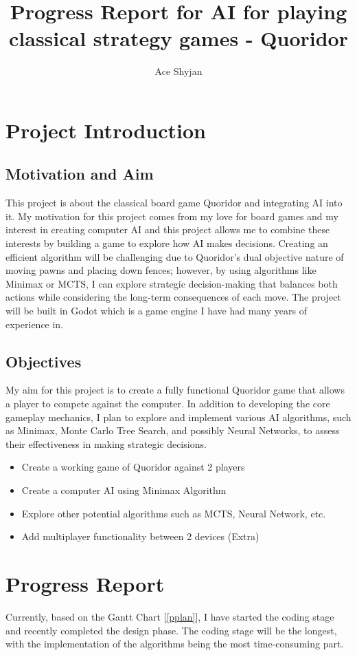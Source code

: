 \documentclass[progress]{cmpreport}
\title{Progress Report for AI for playing classical strategy games - Quoridor}
\author{Ace Shyjan}
\begin{document}
\section{Project Introduction}

\subsection{Motivation and Aim}
This project is about the classical board game Quoridor and integrating AI into it. My motivation for this project comes from my love for board games and my interest in creating computer AI and this project allows me to combine these interests by building a game to explore how AI makes decisions. Creating an efficient algorithm will be challenging due to Quoridor's dual objective nature of moving pawns and placing down fences; however, by using algorithms like Minimax or MCTS, I can explore strategic decision-making that balances both actions while considering the long-term consequences of each move. The project will be built in Godot which is a game engine I have had many years of experience in.

\subsection{Objectives}
My aim for this project is to create a fully functional Quoridor game that allows a player to compete against the computer. In addition to developing the core gameplay mechanics, I plan to explore and implement various AI algorithms, such as Minimax, Monte Carlo Tree Search, and possibly Neural Networks, to assess their effectiveness in making strategic decisions.
\begin{itemize}
    \item Create a working game of Quoridor against 2 players
    \item Create a computer AI using Minimax Algorithm
    \item Explore other potential algorithms such as MCTS, Neural Network, etc.
    \item Add multiplayer functionality between 2 devices (Extra)
\end{itemize}

\section{Progress Report}
Currently, based on the Gantt Chart [\ref{pplan}], I have started the coding stage and recently completed the design phase. The coding stage will be the longest, with the implementation of the algorithms being the most time-consuming part.
\end{document}
